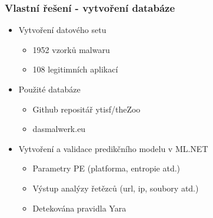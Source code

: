 \documentclass{beamer}
\begin{document}
\begin{frame}
\frametitle{Vlastní řešení - vytvoření databáze} 

\begin{itemize}
    \item Vytvoření datového setu 
    
    \begin{itemize}
        \item 1952 vzorků malwaru
        \item 108 legitimních aplikací
    \end{itemize}
    
    \item Použité databáze
        \begin{itemize}
            \item Github repositář ytisf/theZoo
            \item dasmalwerk.eu
        \end{itemize}
        
    \item Vytvoření a validace predikčního modelu v ML.NET
        \begin{itemize}
            \item Parametry PE (platforma, entropie atd.)
            \item Výstup analýzy řetězců (url, ip, soubory atd.)
            \item Detekována pravidla Yara
        \end{itemize}
\end{itemize}

\end{frame}
\end{document}
